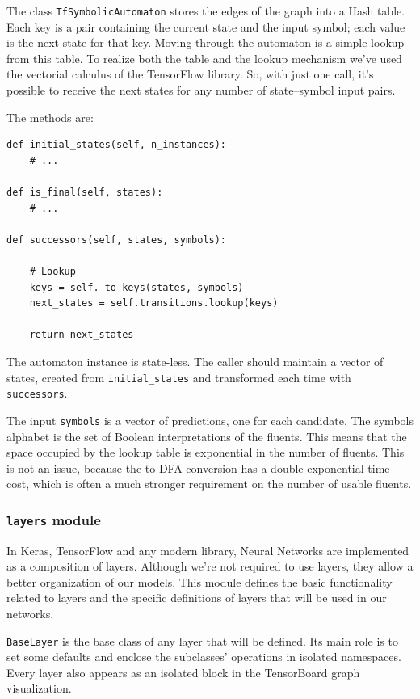 The class \texttt{TfSymbolicAutomaton} stores the edges of the graph into a
Hash table. Each key is a pair containing the current state and the input
symbol; each value is the next state for that key. Moving through the
automaton is a simple lookup from this table. To realize both the table and
the lookup mechanism we've used the vectorial calculus of the TensorFlow
library. So, with just one call, it's possible to receive the next states for
any number of state--symbol input pairs.

The methods are:
\begin{lstlisting}[style=python]
def initial_states(self, n_instances):
	# ...

def is_final(self, states):
	# ...

def successors(self, states, symbols):

	# Lookup
	keys = self._to_keys(states, symbols)
	next_states = self.transitions.lookup(keys)
	
	return next_states
\end{lstlisting}
The automaton instance is state-less. The caller should maintain a vector of
states, created from \verb|initial_states| and transformed each time with
\texttt{successors}.

The input \texttt{symbols} is a vector of predictions, one for each candidate.
The symbols alphabet is the set of Boolean interpretations of the fluents.
This means that the space occupied by the lookup table is exponential in the
number of fluents. This is not an issue, because the \ldl{} to DFA conversion
has a double-exponential time cost, which is often a much stronger requirement
on the number of usable fluents.


\subsubsection*{\texttt{layers} module}

In Keras, TensorFlow and any modern library, Neural Networks are implemented
as a composition of layers. Although we're not required to use layers, they
allow a better organization of our models. This module defines the basic
functionality related to layers and the specific definitions of layers that
will be used in our networks.

\texttt{BaseLayer} is the base class of any layer that will be defined.
Its main role is to set some defaults and enclose the subclasses' operations
in isolated namespaces. Every layer also appears as an isolated block in the
TensorBoard graph visualization.

